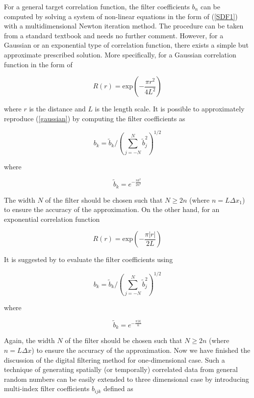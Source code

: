 For a general target correlation function, the filter coefficients $b_n$ can be computed by solving a system of non-linear equations in the form of (\ref{SDF1}) with a multidimensional Newton iteration method. The procedure can be taken from a standard textbook and needs no further comment. However, for a Gaussian or an exponential type of correlation function, there exists a simple but approximate prescribed solution. More specifically, for a Gaussian correlation function in the form of

\begin{equation} \label{gaussian}
R(r) = \mathrm{exp}\left(-\frac{\pi r^2}{4L^2}\right)
\end{equation}

\noindent where $r$ is the distance and $L$ is the length scale. It is possible to approximately reproduce (\ref{gaussian}) by computing the filter coefficients as

\begin{equation}
b_k = \tilde{b}_k / \left( \sum_{j=-N}^N \tilde{b}_j^2 \right)^{1/2}
\end{equation}

\noindent where

\begin{equation}
\tilde{b}_k = e^{-\frac{\pi k^2}{2n^2}}
\end{equation}

\noindent The width $N$ of the filter should be chosen such that $N\geq 2n$ (where $n=L\Delta x_1$) to ensure the accuracy of the approximation. On the other hand, for an exponential correlation function

\begin{equation}
R(r) = \mathrm{exp}\left(-\frac{\pi |r|}{2L}\right)
\end{equation}

\noindent It is suggested by \citep{xie2008} to evaluate the filter coefficients using

\begin{equation} \label{exponential}
b_k = \tilde{b}_k / \left( \sum_{j=-N}^N \tilde{b}_j^2 \right)^{1/2}
\end{equation}

\noindent where

\begin{equation}
\tilde{b}_k = e^{-\frac{\pi|k|}{n}}
\end{equation}

\noindent Again, the width $N$ of the filter should be chosen such that $N\geq 2n$ (where $n=L\Delta x$) to ensure the accuracy of the approximation. Now we have finished the discussion of the digital filtering method for one-dimensional case. Such a technique of generating spatially (or temporally) correlated data from general random numbers can be easily extended to three dimensional case by introducing multi-index filter coefficients $b_{ijk}$ defined as

